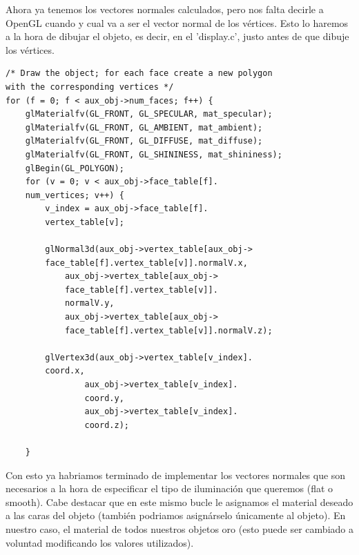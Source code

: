 \documentclass[12pt,a4paper]{article}
\begin{document}
\begin{enumerate}
\begin{enumerate}
\begin{enumerate}
\begin{enumerate}
Ahora ya tenemos los vectores normales calculados, pero nos falta decirle a OpenGL cuando y cual va a ser el vector normal de los vértices. Esto lo haremos a la hora de dibujar el objeto, es decir, en el 'display.c', justo antes de que dibuje los vértices.

\begin{lstlisting}
/* Draw the object; for each face create a new polygon 
with the corresponding vertices */
for (f = 0; f < aux_obj->num_faces; f++) {
    glMaterialfv(GL_FRONT, GL_SPECULAR, mat_specular);
    glMaterialfv(GL_FRONT, GL_AMBIENT, mat_ambient);
    glMaterialfv(GL_FRONT, GL_DIFFUSE, mat_diffuse);
    glMaterialfv(GL_FRONT, GL_SHININESS, mat_shininess);
    glBegin(GL_POLYGON);
    for (v = 0; v < aux_obj->face_table[f].
    num_vertices; v++) {
        v_index = aux_obj->face_table[f].
        vertex_table[v];

        glNormal3d(aux_obj->vertex_table[aux_obj->
        face_table[f].vertex_table[v]].normalV.x,
            aux_obj->vertex_table[aux_obj->
            face_table[f].vertex_table[v]].
            normalV.y,
            aux_obj->vertex_table[aux_obj->
            face_table[f].vertex_table[v]].normalV.z);
            
        glVertex3d(aux_obj->vertex_table[v_index].
        coord.x,
                aux_obj->vertex_table[v_index].
                coord.y,
                aux_obj->vertex_table[v_index].
                coord.z);

    }
\end{lstlisting}
Con esto ya habriamos terminado de implementar los vectores normales que son necesarios a la hora de especificar el tipo de iluminación que queremos (flat o smooth).\newline
Cabe destacar que en este mismo bucle le asignamos el material deseado a las caras del objeto (también podriamos asignárselo únicamente al objeto). En nuestro caso, el material de todos nuestros objetos oro (esto puede ser cambiado a voluntad modificando los valores utilizados).
\end{enumerate}


\end{enumerate}
\end{enumerate}
\end{enumerate}
\end{document}

